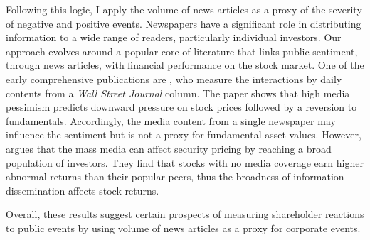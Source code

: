 Following this logic, I apply the volume of news articles as a proxy of the severity of negative and positive events. Newspapers have a significant role in distributing information to a wide range of readers, particularly individual investors. Our approach evolves around a popular core of literature that links public sentiment, through news articles, with financial performance on the stock market. One of the early comprehensive publications are \cite{tetlock_sentiment}, who measure the interactions by daily contents from a \textit{Wall Street Journal} column. The paper shows that high media pessimism predicts downward pressure on stock prices followed by a reversion to fundamentals. Accordingly, the media content from a single newspaper may influence the sentiment but is not a proxy for fundamental asset values. However, \cite{fang2009media} argues that the mass media can affect security pricing by reaching a broad population of investors. They find that stocks with no media coverage earn higher abnormal returns than their popular peers, thus the broadness of information dissemination affects stock returns. 

Overall, these results suggest certain prospects of measuring shareholder reactions to public events by using volume of news articles as a proxy for corporate events. %
